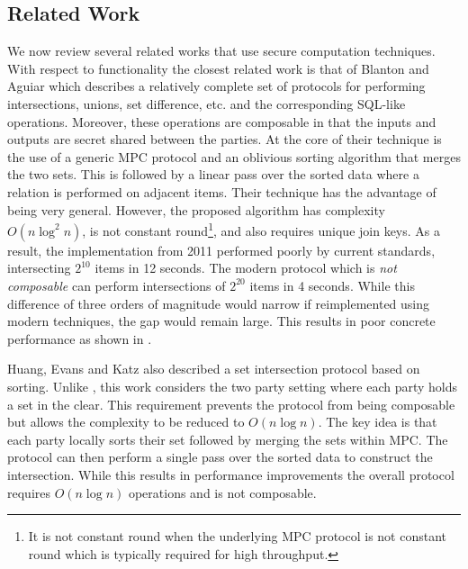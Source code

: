 \subsection{Related Work}
We now review several related works that use secure computation techniques. With respect to functionality the closest related work is that of Blanton and Aguiar\cite{ASIACCS:BlaAgu12} which describes a relatively complete set of protocols for performing intersections, unions, set difference, etc. and the corresponding SQL-like operations. Moreover, these operations are composable in that the inputs and outputs are secret shared between the parties. At the core of their technique is the use of a generic MPC protocol and an oblivious sorting algorithm that merges the two sets. This is followed by a linear pass over the sorted data where a relation is performed on adjacent items. Their technique has the advantage of being very general. However, the proposed algorithm has complexity $O(n \log^2 n)$, is not constant round\footnote{It is not constant round when the underlying MPC protocol is not constant round which is typically required for high throughput.},  and also requires unique join keys. 
\iffullversion
As a result, the implementation from 2011 performed poorly by current standards, intersecting $2^{10}$ items in 12 seconds. The modern protocol \cite{CCS:KKRT16} which is \emph{not composable} can perform intersections of $2^{20}$ items in 4 seconds. While this difference of three orders of magnitude would narrow if reimplemented using modern techniques, the gap would remain large.
\else
This results in poor concrete performance as shown in .
\fi


\iffullversion
Huang, Evans and Katz\cite{HEK12} also described a set intersection protocol based on sorting. Unlike \cite{ASIACCS:BlaAgu12}, this work considers the two party setting where each party holds a set in the clear.
This requirement prevents the protocol from being composable but allows the complexity to be reduced to $O(n\log n)$. The key idea is that each party locally sorts their set followed by merging the sets within MPC. The protocol can then perform a single pass over the sorted data to construct the intersection. While this results in performance improvements the overall protocol requires  $O(n\log n)$ operations and is not composable.
\fi


